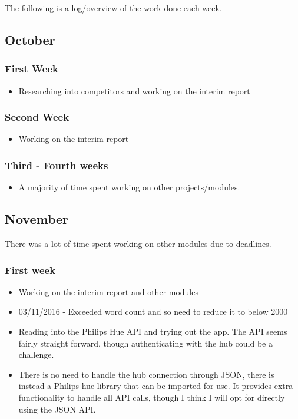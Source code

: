 The following is a log/overview of the work done each week.

\subsection{October}\label{october}

\subsubsection*{First Week}\label{first-week}

\begin{itemize}
\tightlist
\item
  Researching into competitors and working on the interim report
\end{itemize}

\subsubsection*{Second Week}\label{second-week}

\begin{itemize}
\tightlist
\item
  Working on the interim report
\end{itemize}

\subsubsection*{Third - Fourth weeks}\label{third---fourth-weeks}

\begin{itemize}
\tightlist
\item
  A majority of time spent working on other projects/modules.
\end{itemize}

\subsection{November}\label{november}

There was a lot of time spent working on other modules due to deadlines.

\subsubsection*{First week}\label{first-week-1}

\begin{itemize}
\tightlist
\item
  Working on the interim report and other modules
\item
  03/11/2016 - Exceeded word count and so need to reduce it to below
  2000
\item
  Reading into the Philips Hue API and trying out the app. The API seems
  fairly straight forward, though authenticating with the hub could be a
  challenge.
\item
  There is no need to handle the hub connection through JSON, there is
  instead a Philips hue library that can be imported for use. It
  provides extra functionality to handle all API calls, though I think I
  will opt for directly using the JSON API.
\end{itemize}

